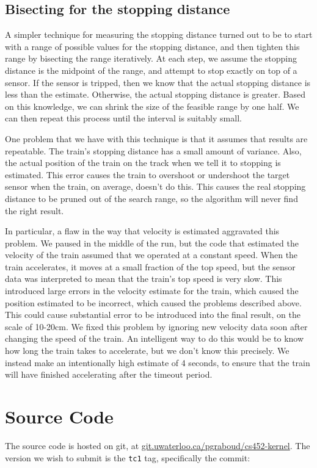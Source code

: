 \documentclass[titlepage]{article}
\begin{document}
\subsection{Bisecting for the stopping distance}
A simpler technique for measuring the stopping distance turned out to be to
start with a range of possible values for the stopping distance, and then
tighten this range by bisecting the range iteratively.
At each step, we assume the stopping distance is the midpoint of
the range, and attempt to stop exactly on top of a sensor.
If the sensor is tripped, then we know that the actual stopping distance
is less than the estimate.
Otherwise, the actual stopping distance is greater.
Based on this knowledge, we can shrink the size of the feasible range by
one half.
We can then repeat this process until the interval is suitably small.

One problem that we have with this technique is that it assumes that results
are repeatable.
The train's stopping distance has a small amount of variance.
Also, the actual position of the train on the track when we tell it to stopping
is estimated.
This error causes the train to overshoot or undershoot the target sensor when
the train, on average, doesn't do this.
This causes the real stopping distance to be pruned out of the search range, so
the algorithm will never find the right result.

In particular, a flaw in the way that velocity is estimated aggravated this problem.
We paused in the middle of the run, but the code that estimated the velocity
of the train assumed that we operated at a constant speed.
When the train accelerates, it moves at a small fraction of the top speed,
but the sensor data was interpreted to mean that the train's top speed is
very slow.
This introduced large errors in the velocity estimate for the train, which
caused the position estimated to be incorrect, which caused the problems described
above.
This could cause substantial error to be introduced into the final result, on
the scale of 10-20cm.
We fixed this problem by ignoring new velocity data soon after changing
the speed of the train.
An intelligent way to do this would be to know how long the train
takes to accelerate, but we don't know this precisely.
We instead make an intentionally high estimate of 4 seconds, to ensure
that the train will have finished accelerating after the timeout period.


\section{Source Code}
The source code is hosted on git, at \url{git.uwaterloo.ca/pgraboud/cs452-kernel}.
The version we wish to submit is the \texttt{tc1} tag, specifically
the commit:

\end{document}
